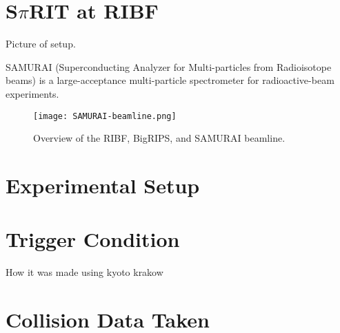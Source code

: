 \section{S$\pi$RIT at RIBF}
Picture of setup. 




SAMURAI (Superconducting Analyzer for Multi-particles from Radioisotope beams) is a large-acceptance multi-particle spectrometer for radioactive-beam experiments.
\begin{figure}[H]
\texttt{[image: SAMURAI-beamline.png]}
\caption{Overview of the RIBF, BigRIPS, and SAMURAI beamline.}
\label{fig:sambl}
\end{figure}

\section{Experimental Setup}

\section{Trigger Condition}
How it was made using kyoto krakow

\section{Collision Data Taken}

